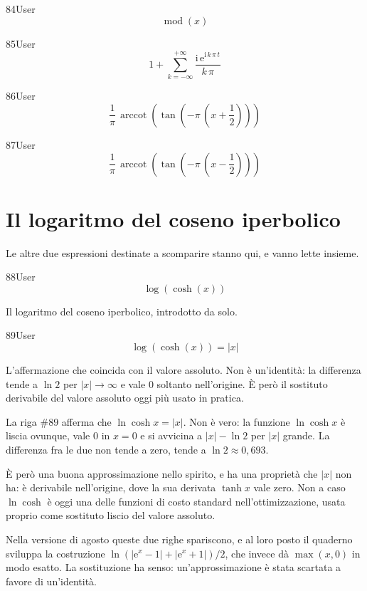 \begin{espr}{84}{User}{}
\[
\operatorname{mod}\!\left(x\right)
\]
\end{espr}
\begin{espr}{85}{User}{}
\[
1 + \sum_{k=-\infty}^{+\infty} \frac{\mathrm{i}\, \mathrm{e}^{\mathrm{i}\, k\, \pi\, t}}{k\, \pi}
\]
\end{espr}
\begin{espr}{86}{User}{}
\[
\frac{1}{\pi}\, \operatorname{arccot}\!\left(\tan\!\left(-\pi\, \left(x + \frac{1}{2}\right)\right)\right)
\]
\end{espr}
\begin{espr}{87}{User}{}
\[
\frac{1}{\pi}\, \operatorname{arccot}\!\left(\tan\!\left(-\pi\, \left(x - \frac{1}{2}\right)\right)\right)
\]
\end{espr}
\section{Il logaritmo del coseno iperbolico}

Le altre due espressioni destinate a scomparire stanno qui, e vanno lette insieme.

\begin{espr}{88}{User}{}
\[
\log\!\left(\cosh\!\left(x\right)\right)
\]
\end{espr}
Il logaritmo del coseno iperbolico, introdotto da solo.

\begin{espr}{89}{User}{}
\[
\log\!\left(\cosh\!\left(x\right)\right) = \left|x\right|
\]
\end{espr}
L'affermazione che coincida con il valore assoluto. Non è un'identità: la differenza tende a $\ln2$ per $|x|\to\infty$ e vale $0$ soltanto nell'origine. È però il sostituto derivabile del valore assoluto oggi più usato in pratica.


La riga $\#89$ afferma che $\ln\cosh x=|x|$. Non è vero: la funzione $\ln\cosh x$ è liscia ovunque, vale $0$ in $x=0$ e si avvicina a $|x|-\ln2$ per $|x|$ grande. La differenza fra le due non tende a zero, tende a $\ln 2\approx0{,}693$.

È però una buona approssimazione nello spirito, e ha una proprietà che $|x|$ non ha: è derivabile nell'origine, dove la sua derivata $\tanh x$ vale zero. Non a caso $\ln\cosh$ è oggi una delle funzioni di costo standard nell'ottimizzazione, usata proprio come sostituto liscio del valore assoluto.

Nella versione di agosto queste due righe spariscono, e al loro posto il quaderno sviluppa la costruzione $\ln\!\left(\left|\mathrm{e}^x-1\right|+\left|\mathrm{e}^x+1\right|\right)/2$, che invece dà $\max(x,0)$ in modo esatto. La sostituzione ha senso: un'approssimazione è stata scartata a favore di un'identità.


